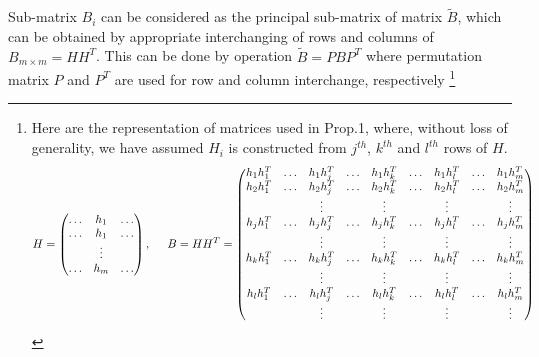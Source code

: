 Sub-matrix $B_{i}$ can be considered as the principal sub-matrix of matrix $\tilde{B}$, which can be obtained by appropriate interchanging of rows and columns of $B_{m\times m}=HH^{T}$. This can be done by operation $\tilde{B} = PBP^{T}$ where permutation matrix $P$ and $P^{T}$ are used for row and column interchange, respectively \footnote{ Here are the representation of matrices used in Prop.1, where, without loss of generality, we have assumed $H_{i}$ is constructed from $j^{th}$, $k^{th}$ and $l^{th}$ rows of $H$.  
\[
 H =
 \begin{pmatrix}
  \hdots & h_{1} & \hdots \\
  \hdots & h_{1} & \hdots \\
     &  \vdots &  \\
  \hdots & h_{m} & \hdots \\  
 \end{pmatrix}, \hspace{0.5cm}
 B = HH^{T} = 
 \begin{pmatrix}
  h_{1}h^{T}_{1} & \hdots & h_{1}h^{T}_{j} & \hdots & h_{1}h^{T}_{k} & \hdots & h_{1}h^{T}_{l} & \hdots & h_{1}h^{T}_{m}  \\
  h_{2}h^{T}_{1} & \hdots & h_{2}h^{T}_{j} & \hdots & h_{2}h^{T}_{k} & \hdots & h_{2}h^{T}_{l} & \hdots & h_{2}h^{T}_{m}  \\
                 &    &      \vdots    &    &      \vdots    &    &   \vdots       &    &    \vdots       \\                             
  h_{j}h^{T}_{1} & \hdots & h_{j}h^{T}_{j} & \hdots & h_{j}h^{T}_{k} & \hdots & h_{j}h^{T}_{l} & \hdots & h_{j}h^{T}_{m}  \\
                 &    &      \vdots    &    &      \vdots    &    &   \vdots       &    &    \vdots       \\                             
  h_{k}h^{T}_{1} & \hdots & h_{k}h^{T}_{j} & \hdots & h_{k}h^{T}_{k} & \hdots & h_{k}h^{T}_{l} & \hdots & h_{k}h^{T}_{m}  \\                 
                 &    &      \vdots    &    &      \vdots    &    &   \vdots       &    &    \vdots       \\                             
  h_{l}h^{T}_{1} & \hdots & h_{l}h^{T}_{j} & \hdots & h_{l}h^{T}_{k} & \hdots & h_{l}h^{T}_{l} & \hdots & h_{l}h^{T}_{m}  \\
                 &    &      \vdots    &    &      \vdots    &    &   \vdots       &    &    \vdots       \\                             

\end{pmatrix}\]}
